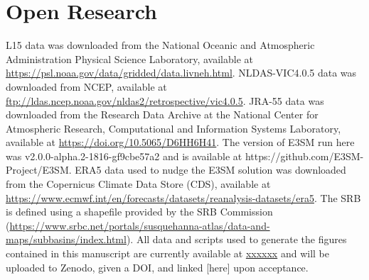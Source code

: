 \documentclass[draft]{agujournal2019}
\begin{document}
%


\section{Open Research}

L15 data was downloaded from the National Oceanic and Atmospheric Administration Physical Science Laboratory, available at \url{https://psl.noaa.gov/data/gridded/data.livneh.html}. NLDAS-VIC4.0.5 data was downloaded from NCEP, available at \url{ftp://ldas.ncep.noaa.gov/nldas2/retrospective/vic4.0.5}. JRA-55 data was downloaded from the Research Data Archive at the National Center for Atmospheric Research, Computational and Information Systems Laboratory, available at \url{https://doi.org/10.5065/D6HH6H41}. The version of E3SM run here was v2.0.0-alpha.2-1816-gf9cbe57a2 and is available at https://github.com/E3SM-Project/E3SM. ERA5 data used to nudge the E3SM solution was downloaded from the Copernicus Climate Data Store (CDS), available at \url{https://www.ecmwf.int/en/forecasts/datasets/reanalysis-datasets/era5}. The SRB is defined using a shapefile provided by the SRB Commission (\url{https://www.srbc.net/portals/susquehanna-atlas/data-and-maps/subbasins/index.html}). All data and scripts used to generate the figures contained in this manuscript are currently available at \url{xxxxxx} and will be uploaded to Zenodo, given a DOI, and linked [here] upon acceptance.



%
%
%
%
%
%
%
%
\end{document}
